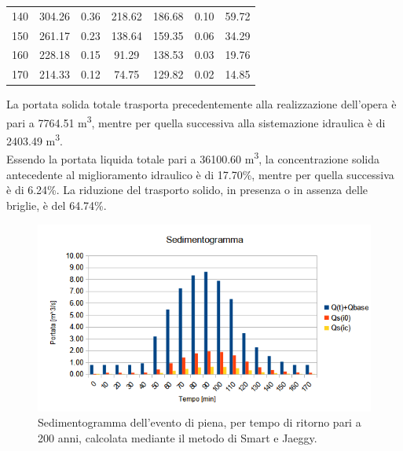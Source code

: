 \begin{table}[H]
\begin{tabular}{ccccccc}
    140      & 304.26                       & 0.36   & 218.62  & 186.68                       & 0.10   & 59.72  \\
    150      & 261.17                       & 0.23   & 138.64  & 159.35                       & 0.06   & 34.29  \\
    160      & 228.18                       & 0.15   & 91.29   & 138.53                       & 0.03   & 19.76  \\
    170      & 214.33                       & 0.12   & 74.75   & 129.82                       & 0.02   & 14.85 \\
    \bottomrule
    \end{tabular}
    \end{table}
La portata solida totale trasporta precedentemente alla realizzazione dell'opera è pari a 7764.51 \unit{m^3}, mentre per quella successiva alla sistemazione idraulica è di 2403.49 \unit{m^3}.\\
Essendo la portata liquida totale pari a 36100.60 \unit{m^3}, la concentrazione solida antecedente al miglioramento idraulico è di 17.70\%, mentre per quella successiva è di 6.24\%. La riduzione del trasporto solido, in presenza o in assenza delle briglie, è del 64.74\%.\\
\begin{figure}[H] \centering
    \includegraphics[scale=0.75]{immagini/sedimentogramma_smart_jaeggy.png}
    \caption{Sedimentogramma dell'evento di piena, per tempo di ritorno pari a 200 anni, calcolata mediante il metodo di Smart e Jaeggy.}
    \label{sedimentogramma_smart_jaeggy}
\end{figure}


